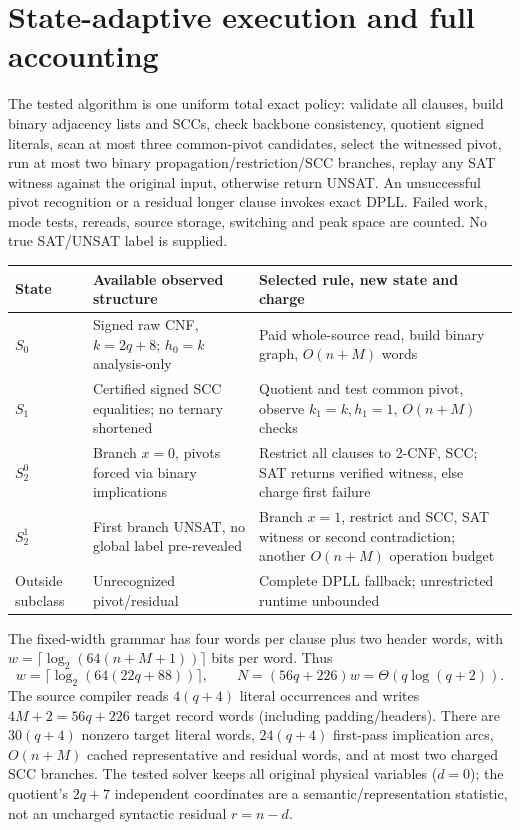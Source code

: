 \documentclass[11pt]{article}
\begin{document}
\section{State-adaptive execution and full accounting}
The tested algorithm is one uniform total exact policy: validate all
clauses, build binary adjacency lists and SCCs, check backbone
consistency, quotient signed literals, scan at most three common-pivot
candidates, select the witnessed pivot, run at most two binary
propagation/restriction/SCC branches, replay any SAT witness against
the original input, otherwise return UNSAT. An unsuccessful pivot
recognition or a residual longer clause invokes exact DPLL. Failed
work, mode tests, rereads, source storage, switching and peak space
are counted. No true SAT/UNSAT label is supplied.

\begin{center}\small
\begin{tabular}{p{.12\linewidth}p{.33\linewidth}p{.43\linewidth}}
\toprule
State & Available observed structure & Selected rule, new state and charge\\
\midrule
$S_0$ & Signed raw CNF, $k=2q+8$; $h_0=k$ analysis-only &
Paid whole-source read, build binary graph, $O(n+M)$ words\\
$S_1$ & Certified signed SCC equalities; no ternary shortened &
Quotient and test common pivot, observe $k_1=k,h_1=1$,
$O(n+M)$ checks\\
$S_2^0$ & Branch $x=0$, pivots forced via binary implications &
Restrict all clauses to 2-CNF, SCC; SAT returns verified witness,
else charge first failure\\
$S_2^1$ & First branch UNSAT, no global label pre-revealed &
Branch $x=1$, restrict and SCC, SAT witness or second contradiction;
another $O(n+M)$ operation budget\\
Outside subclass & Unrecognized pivot/residual &
Complete DPLL fallback; unrestricted runtime unbounded\\
\bottomrule
\end{tabular}
\end{center}
The fixed-width grammar has four words per clause plus two header
words, with $w=\lceil\log_2(64(n+M+1))\rceil$ bits per word. Thus
\[
\boxed{w=\lceil\log_2(64(22q+88))\rceil,\qquad
N=(56q+226)w=\Theta(q\log(q+2)).}
\]
The source compiler reads $4(q+4)$ literal occurrences and writes
$4M+2=56q+226$ target record words (including padding/headers).
There are $30(q+4)$ nonzero target literal words, $24(q+4)$
first-pass implication arcs, $O(n+M)$ cached representative and
residual words, and at most two charged SCC branches. The tested
solver keeps all original physical variables ($d=0$); the quotient's
$2q+7$ independent coordinates are a semantic/representation
statistic, not an uncharged syntactic residual $r=n-d$.
\end{document}
